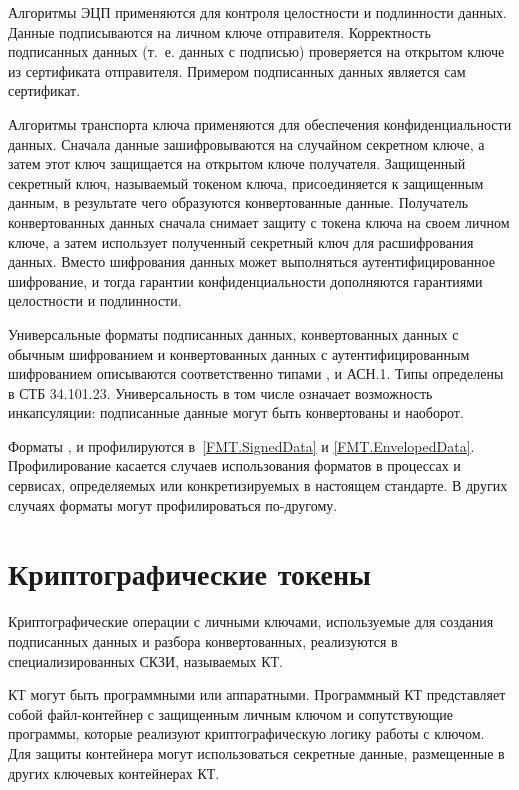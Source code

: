 Алгоритмы ЭЦП применяются для контроля целостности и подлинности данных. Данные
подписываются на личном ключе отправителя. Корректность подписанных данных
(т.~е. данных с подписью) проверяется на открытом ключе из сертификата
отправителя. Примером подписанных данных является сам сертификат.

Алгоритмы транспорта ключа применяются для обеспечения конфиденциальности
данных. Сначала данные зашифровываются на случайном секретном ключе, а затем этот
ключ защищается на открытом ключе получателя. Защищенный секретный ключ,
называемый токеном ключа, присоединяется к защищенным данным, в результате чего
образуются конвертованные данные. Получатель конвертованных данных сначала
снимает защиту с токена ключа на своем личном ключе, а затем использует
полученный секретный ключ для расшифрования данных.
%
Вместо шифрования данных может выполняться аутентифицированное шифрование,
и тогда гарантии конфиденциальности дополняются гарантиями целостности и 
подлинности.

Универсальные форматы подписанных данных, конвертованных данных с обычным 
шифрованием и конвертованных данных с аутентифицированным шифрованием 
описываются соответственно типами ,  и  
 АСН.1.
%
Типы определены в СТБ 34.101.23.
%
Универсальность в том числе означает возможность инкапсуляции: подписанные
данные могут быть конвертованы и наоборот.

Форматы ,  и  
профилируются в~\ref{FMT.SignedData} и \ref{FMT.EnvelopedData}. Профилирование 
касается случаев использования форматов в процессах и сервисах, определяемых 
или конкретизируемых в настоящем стандарте. В других случаях форматы могут 
профилироваться по-другому.

\section{Криптографические токены}\label{COMMON.CT}

Криптографические операции с личными ключами, используемые для создания
подписанных данных и разбора конвертованных, реализуются в специализированных
СКЗИ, называемых КТ.
                                        
КТ могут быть программными или аппаратными. Программный КТ представляет собой
файл-контейнер с защищенным личным ключом и сопутствующие программы, которые
реализуют криптографическую логику работы с ключом. Для защиты контейнера могут
использоваться секретные данные, размещенные в других ключевых контейнерах КТ.

